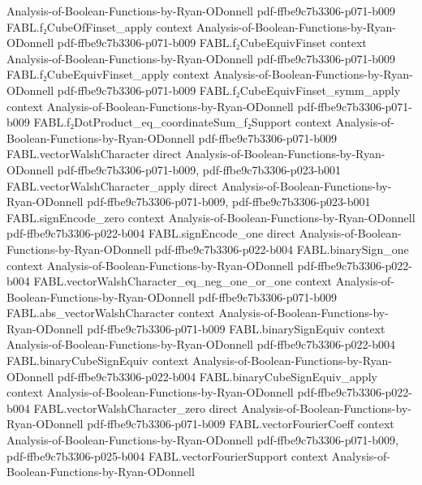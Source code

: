 \begin{theorem}
  {Analysis-of-Boolean-Functions-by-Ryan-ODonnell}
  {pdf-ffbe9c7b3306-p071-b009}
\proofstep
  {FABL.f₂CubeOfFinset_apply}
  {context}
  {Analysis-of-Boolean-Functions-by-Ryan-ODonnell}
  {pdf-ffbe9c7b3306-p071-b009}
\proofstep
  {FABL.f₂CubeEquivFinset}
  {context}
  {Analysis-of-Boolean-Functions-by-Ryan-ODonnell}
  {pdf-ffbe9c7b3306-p071-b009}
\proofstep
  {FABL.f₂CubeEquivFinset_apply}
  {context}
  {Analysis-of-Boolean-Functions-by-Ryan-ODonnell}
  {pdf-ffbe9c7b3306-p071-b009}
\proofstep
  {FABL.f₂CubeEquivFinset_symm_apply}
  {context}
  {Analysis-of-Boolean-Functions-by-Ryan-ODonnell}
  {pdf-ffbe9c7b3306-p071-b009}
\proofstep
  {FABL.f₂DotProduct_eq_coordinateSum_f₂Support}
  {context}
  {Analysis-of-Boolean-Functions-by-Ryan-ODonnell}
  {pdf-ffbe9c7b3306-p071-b009}
\proofstep
  {FABL.vectorWalshCharacter}
  {direct}
  {Analysis-of-Boolean-Functions-by-Ryan-ODonnell}
  {pdf-ffbe9c7b3306-p071-b009,
    pdf-ffbe9c7b3306-p023-b001}
\proofstep
  {FABL.vectorWalshCharacter_apply}
  {direct}
  {Analysis-of-Boolean-Functions-by-Ryan-ODonnell}
  {pdf-ffbe9c7b3306-p071-b009,
    pdf-ffbe9c7b3306-p023-b001}
\proofstep
  {FABL.signEncode_zero}
  {context}
  {Analysis-of-Boolean-Functions-by-Ryan-ODonnell}
  {pdf-ffbe9c7b3306-p022-b004}
\proofstep
  {FABL.signEncode_one}
  {direct}
  {Analysis-of-Boolean-Functions-by-Ryan-ODonnell}
  {pdf-ffbe9c7b3306-p022-b004}
\proofstep
  {FABL.binarySign_one}
  {context}
  {Analysis-of-Boolean-Functions-by-Ryan-ODonnell}
  {pdf-ffbe9c7b3306-p022-b004}
\proofstep
  {FABL.vectorWalshCharacter_eq_neg_one_or_one}
  {context}
  {Analysis-of-Boolean-Functions-by-Ryan-ODonnell}
  {pdf-ffbe9c7b3306-p071-b009}
\proofstep
  {FABL.abs_vectorWalshCharacter}
  {context}
  {Analysis-of-Boolean-Functions-by-Ryan-ODonnell}
  {pdf-ffbe9c7b3306-p071-b009}
\proofstep
  {FABL.binarySignEquiv}
  {context}
  {Analysis-of-Boolean-Functions-by-Ryan-ODonnell}
  {pdf-ffbe9c7b3306-p022-b004}
\proofstep
  {FABL.binaryCubeSignEquiv}
  {context}
  {Analysis-of-Boolean-Functions-by-Ryan-ODonnell}
  {pdf-ffbe9c7b3306-p022-b004}
\proofstep
  {FABL.binaryCubeSignEquiv_apply}
  {context}
  {Analysis-of-Boolean-Functions-by-Ryan-ODonnell}
  {pdf-ffbe9c7b3306-p022-b004}
\proofstep
  {FABL.vectorWalshCharacter_zero}
  {direct}
  {Analysis-of-Boolean-Functions-by-Ryan-ODonnell}
  {pdf-ffbe9c7b3306-p071-b009}
\proofstep
  {FABL.vectorFourierCoeff}
  {context}
  {Analysis-of-Boolean-Functions-by-Ryan-ODonnell}
  {pdf-ffbe9c7b3306-p071-b009,
    pdf-ffbe9c7b3306-p025-b004}
\proofstep
  {FABL.vectorFourierSupport}
  {context}
  {Analysis-of-Boolean-Functions-by-Ryan-ODonnell}

\end{theorem}
